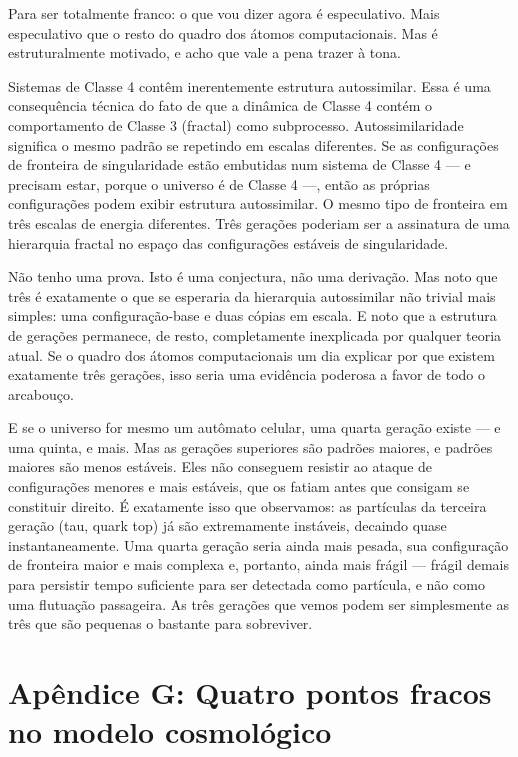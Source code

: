 \documentclass[11pt, twoside, openright]{book}
\begin{document}
Para ser totalmente franco: o que vou dizer agora é especulativo. Mais especulativo que o resto do quadro dos átomos computacionais. Mas é estruturalmente motivado, e acho que vale a pena trazer à tona.

Sistemas de Classe 4 contêm inerentemente estrutura autossimilar. Essa é uma consequência técnica do fato de que a dinâmica de Classe 4 contém o comportamento de Classe 3 (fractal) como subprocesso. Autossimilaridade significa o mesmo padrão se repetindo em escalas diferentes. Se as configurações de fronteira de singularidade estão embutidas num sistema de Classe 4 --- e precisam estar, porque o universo é de Classe 4 ---, então as próprias configurações podem exibir estrutura autossimilar. O mesmo tipo de fronteira em três escalas de energia diferentes. Três gerações poderiam ser a assinatura de uma hierarquia fractal no espaço das configurações estáveis de singularidade.

Não tenho uma prova. Isto é uma conjectura, não uma derivação. Mas noto que três é exatamente o que se esperaria da hierarquia autossimilar não trivial mais simples: uma configuração-base e duas cópias em escala. E noto que a estrutura de gerações permanece, de resto, completamente inexplicada por qualquer teoria atual. Se o quadro dos átomos computacionais um dia explicar por que existem exatamente três gerações, isso seria uma evidência poderosa a favor de todo o arcabouço.

E se o universo for mesmo um autômato celular, uma quarta geração existe --- e uma quinta, e mais. Mas as gerações superiores são padrões maiores, e padrões maiores são menos estáveis. Eles não conseguem resistir ao ataque de configurações menores e mais estáveis, que os fatiam antes que consigam se constituir direito. É exatamente isso que observamos: as partículas da terceira geração (tau, quark top) já são extremamente instáveis, decaindo quase instantaneamente. Uma quarta geração seria ainda mais pesada, sua configuração de fronteira maior e mais complexa e, portanto, ainda mais frágil --- frágil demais para persistir tempo suficiente para ser detectada como partícula, e não como uma flutuação passageira. As três gerações que vemos podem ser simplesmente as três que são pequenas o bastante para sobreviver.


\chapter*{Apêndice G: Quatro pontos fracos no modelo cosmológico}
\end{document}
